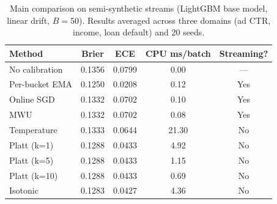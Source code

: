 \begin{table}[H]
\centering
\begin{tabular}{@{}lcccc@{}}
\toprule
Method & Brier & ECE & CPU ms/batch & Streaming?\\
\midrule
No calibration & 0.1356 & 0.0799 & 0.00 & ---\\
Per-bucket EMA & 0.1250 & 0.0208 & 0.12 & Yes\\
Online SGD & 0.1332 & 0.0702 & 0.10 & Yes\\
MWU & 0.1332 & 0.0702 & 0.08 & Yes\\
Temperature & 0.1333 & 0.0644 & 21.30 & No\\
Platt (k=1) & 0.1288 & 0.0433 & 4.92 & No\\
Platt (k=5) & 0.1288 & 0.0433 & 1.15 & No\\
Platt (k=10) & 0.1288 & 0.0433 & 0.69 & No\\
Isotonic & 0.1283 & 0.0427 & 4.36 & No\\
\bottomrule
\end{tabular}
\caption{Main comparison on semi-synthetic streams (LightGBM base model, linear drift, $B=50$). Results averaged across three domains (ad CTR, income, loan default) and 20 seeds.}
\label{tab:main_comparison}
\end{table}
